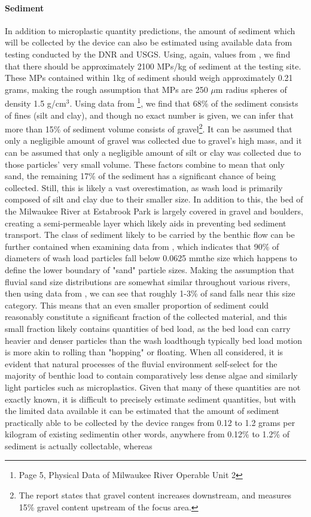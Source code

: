 \documentclass[fleqn,10pt]{SelfArx} %
\begin{document}
	\paragraph{Sediment}
	In addition to microplastic quantity predictions, the amount of sediment which will be collected by the device can also be estimated using available data from testing conducted by the DNR and USGS. Using, again, values from \cite{LenakerEtAlvertdist}, we find that there should be approximately 2100 MPs/kg of sediment at the testing site. These MPs contained within 1kg of sediment should weigh approximately 0.21 grams, making the rough assumption that MPs are 250 $\mu$m radius spheres of density 1.5 g/cm$^3$. Using data from \cite{Foth2020}\footnote{Page 5, Physical Data of Milwaukee River Operable Unit 2}, we find that 68\% of the sediment consists of fines (silt and clay), and though no exact number is given, we can infer that more than 15\% of sediment volume consists of gravel\footnote{The report states that gravel content increases downstream, and measures 15\% gravel content upstream of the focus area.}. It can be assumed that only a negligible amount of gravel was  collected due to gravel's high mass, and it can be assumed that only a negligible amount of silt or clay was collected due to those particles' very small volume. These factors combine to mean that only sand, the remaining 17\% of the sediment has a significant chance of being collected. Still, this is likely a vast overestimation, as wash load is primarily composed of silt and clay due to their smaller size. In addition to this, the bed of the Milwaukee River at Estabrook Park is largely covered in gravel and boulders, creating a semi-permeable layer which likely aids in preventing bed sediment transport. The class of sediment likely to be carried by the \gls{benthic} flow can be further contained when examining data from \cite{Washload_size}, which indicates that 90\% of diameters of wash load particles fall below 0.0625 mm\textemdash the size which happens to define the lower boundary of "sand" particle sizes. Making the assumption that fluvial sand size distributions are somewhat similar throughout various rivers, then using data from \cite{sabd_size_distribution}, we can see that roughly 1-3\% of sand falls near this size category. This means that an even smaller proportion of sediment could reasonably constitute a significant fraction of the collected material, and this small fraction likely contains quantities of bed load, as the bed load can carry heavier and denser particles than the wash load\textemdash though typically bed load motion is more akin to rolling than "hopping" or floating. When all considered, it is evident that natural processes of the fluvial environment self-select for the majority of \gls{benthic} load to contain comparatively less dense algae and similarly light particles such as microplastics. Given that many of these quantities are not exactly known, it is difficult to precisely estimate sediment quantities, but with the limited data available it can be estimated that the amount of sediment practically able to be collected by the device ranges from 0.12 to 1.2 grams per kilogram of existing sediment\textemdash in other words, anywhere from 0.12\% to 1.2\% of sediment is actually collectable, whereas 
\end{document}
